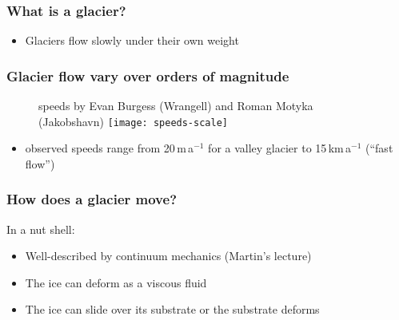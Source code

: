 \documentclass[hide notes,intlimits,unknownkeysallowed]{beamer}
\begin{document}
{
%
} 

\begin{frame}
  \frametitle{What is a glacier?}
  \begin{itemize}
  \item Glaciers flow slowly under their own weight
  \end{itemize}
\end{frame}


\begin{frame}
  \frametitle{Glacier flow vary over orders of magnitude}
  \begin{figure}
    \scriptsize{speeds by Evan Burgess (Wrangell) and Roman Motyka (Jakobshavn)}
    \texttt{[image: speeds-scale]}
  \end{figure}
  \begin{itemize}
    \item observed speeds range from 20\,m\,a$^{-1}$ for a valley glacier to 15\,km\,a$^{-1}$ (``fast flow'')
  \end{itemize}
  \note[itemize]{
}
\end{frame}

\begin{frame}
  \frametitle{How does a glacier move?}
  \begin{block}{In a nut shell:}
    \begin{itemize}
    \item Well-described by continuum mechanics (Martin's lecture)
    \item The ice can deform as a \alert{viscous} fluid
    \item The ice can slide over its substrate or the substrate deforms
    \end{itemize}
  \end{block}
\end{frame}
\end{document}
